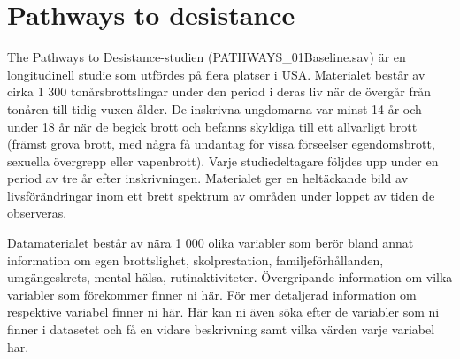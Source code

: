 \documentclass[
]{book}
\begin{document}
\hypertarget{pathways-to-desistance}{%
\section{Pathways to desistance}\label{pathways-to-desistance}}

The Pathways to Desistance-studien (PATHWAYS\_01Baseline.sav) är en longitudinell studie som utfördes på flera platser i USA. Materialet består av cirka 1 300 tonårsbrottslingar under den period i deras liv när de övergår från tonåren till tidig vuxen ålder. De inskrivna ungdomarna var minst 14 år och under 18 år när de begick brott och befanns skyldiga till ett allvarligt brott (främst grova brott, med några få undantag för vissa förseelser egendomsbrott, sexuella övergrepp eller vapenbrott). Varje studiedeltagare följdes upp under en period av tre år efter inskrivningen. Materialet ger en heltäckande bild av livsförändringar inom ett brett spektrum av områden under loppet av tiden de observeras.

Datamaterialet består av nära 1 000 olika variabler som berör bland annat information om egen brottslighet, skolprestation, familjeförhållanden, umgängeskrets, mental hälsa, rutinaktiviteter. Övergripande information om vilka variabler som förekommer finner ni här. För mer detaljerad information om respektive variabel finner ni här. Här kan ni även söka efter de variabler som ni finner i datasetet och få en vidare beskrivning samt vilka värden varje variabel har.

  
\end{document}
